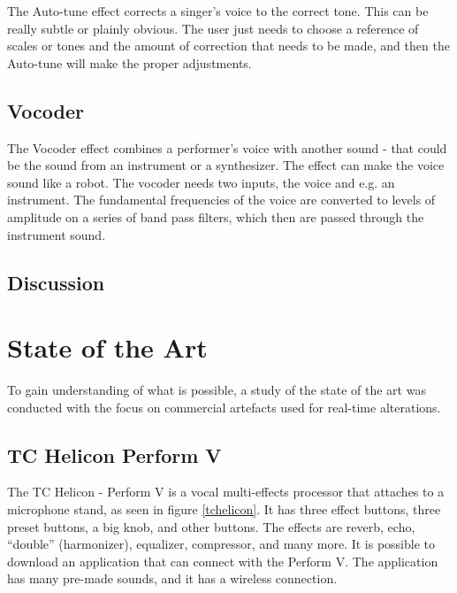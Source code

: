 The Auto-tune effect corrects a singer's voice to the correct tone\citep{Hadhazy_2010}. This can be really subtle or plainly obvious. 
The user just needs to choose a reference of scales or tones and the amount of correction that needs to be made, and then the Auto-tune will make the proper adjustments.

\subsection{Vocoder}

The Vocoder effect combines a performer's voice with another sound - that could be the sound from an instrument or a synthesizer\citep{Vocoder_00}. 
The effect can make the voice sound like a robot. The vocoder needs two inputs, the voice and e.g. an instrument. The fundamental frequencies of the voice are converted to levels of amplitude on a series of band pass filters, which then are passed through the instrument sound.

\subsection{Discussion}




\section{State of the Art}
To gain understanding of what is possible, a study of the state of the art was conducted with the focus on commercial artefacts used for real-time alterations.

\subsection{TC Helicon Perform V}

The TC Helicon - Perform V is a vocal multi-effects processor that attaches to a microphone stand, as seen in figure \ref{tchelicon}\citep{TC}. It has three effect buttons, three preset buttons, a big knob, and other buttons. The effects are reverb, echo, “double” (harmonizer), equalizer, compressor, and many more. It is possible to download an application that can connect with the Perform V. The application has many pre-made sounds, and it has a wireless connection. \\

\begin{minipage}{\linewidth}%
\label{tchelicon}
\end{minipage}\\

